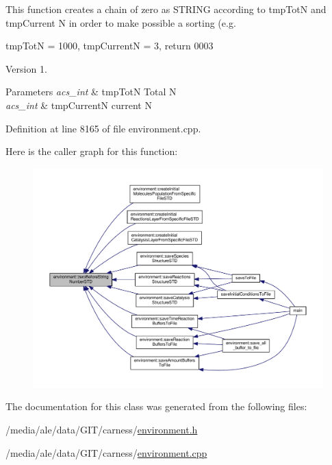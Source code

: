 This function creates a chain of zero as S\-T\-R\-I\-N\-G according to tmp\-Tot\-N and tmp\-Current N in order to make possible a sorting (e.\-g. 

tmp\-Tot\-N = 1000, tmp\-Current\-N = 3, return 0003 \begin{DoxyVersion}{Version}
1. 
\end{DoxyVersion}

\begin{DoxyParams}{Parameters}
{\em acs\-\_\-int} & tmp\-Tot\-N Total N \\
\hline
{\em acs\-\_\-int} & tmp\-Current\-N current N \\
\hline
\end{DoxyParams}


Definition at line 8165 of file environment.\-cpp.



Here is the caller graph for this function\-:\nopagebreak
\begin{figure}[H]
\begin{center}
\leavevmode
\includegraphics[width=350pt]{a00011_a8699a0f85f5e8dc23eb8f78fa22c6b17_icgraph}
\end{center}
\end{figure}




The documentation for this class was generated from the following files\-:\begin{DoxyCompactItemize}
\item 
/media/ale/data/\-G\-I\-T/carness/\hyperlink{a00030}{environment.\-h}\item 
/media/ale/data/\-G\-I\-T/carness/\hyperlink{a00029}{environment.\-cpp}\end{DoxyCompactItemize}
